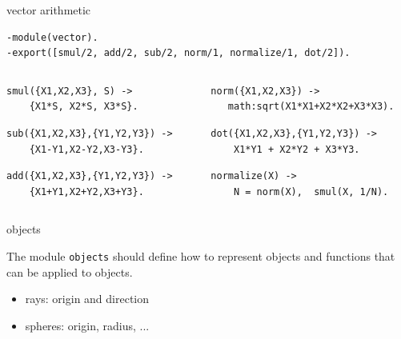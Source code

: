 \begin{frame}[fragile]{vector arithmetic}

\begin{verbatim}
-module(vector).
-export([smul/2, add/2, sub/2, norm/1, normalize/1, dot/2]).
\end{verbatim}

\begin{columns}
 \begin{column}{0.5\linewidth}
  \begin{verbatim}
smul({X1,X2,X3}, S) ->  
    {X1*S, X2*S, X3*S}.
  \end{verbatim}
\pause
  \begin{verbatim}
sub({X1,X2,X3},{Y1,Y2,Y3}) -> 
    {X1-Y1,X2-Y2,X3-Y3}.
  \end{verbatim}
\pause
  \begin{verbatim}
add({X1,X2,X3},{Y1,Y2,Y3}) -> 
    {X1+Y1,X2+Y2,X3+Y3}.
  \end{verbatim}
  \end{column}

  \pause

  \begin{column}{0.5\linewidth}
  \begin{verbatim}
norm({X1,X2,X3}) ->
   math:sqrt(X1*X1+X2*X2+X3*X3).
  \end{verbatim}
\pause
  \begin{verbatim}
dot({X1,X2,X3},{Y1,Y2,Y3}) ->
    X1*Y1 + X2*Y2 + X3*Y3.
  \end{verbatim}
\pause
  \begin{verbatim}
normalize(X) ->
    N = norm(X),  smul(X, 1/N).
  \end{verbatim}
  \end{column}
 \end{columns}

\end{frame}

\begin{frame}[fragile]{objects}

The module {\tt objects} should define how to represent objects and functions that can be applied to objects.

\pause
\begin{itemize}
  \item rays: origin and direction
  \item spheres: origin, radius, ...
 \end{itemize}

\end{frame}

